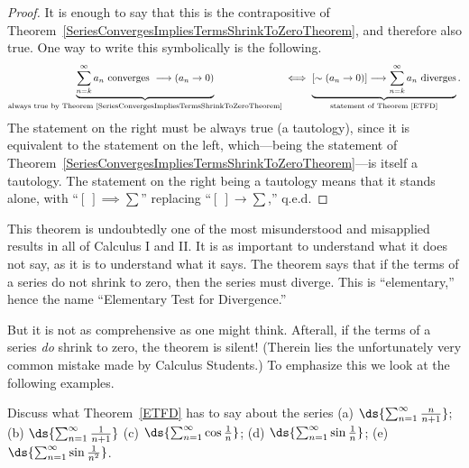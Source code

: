\begin{proof} It is enough to say that this is the contrapositive of 
Theorem~\ref{SeriesConvergesImpliesTermsShrinkToZeroTheorem},
and therefore also true.
One way to write this symbolically is the following.
$$\underbrace{\sum_{n=k}^\infty a_n\text{ converges }
\longrightarrow \left(a_n\to 0\right)}_{\text{always true by
Theorem~\ref{SeriesConvergesImpliesTermsShrinkToZeroTheorem}}}
\iff
\underbrace{
\left[\sim\left(a_n\to 0\right)\right]
\longrightarrow
\sum_{n=k}^\infty a_n\text{ diverges}}_{\text{statement of
Theorem~\ref{ETFD}}}.$$
The statement on the right must be always true (a tautology),
since it is equivalent to the statement on the left,
which---being the statement of  
Theorem~\ref{SeriesConvergesImpliesTermsShrinkToZeroTheorem}---is
itself a tautology.  The statement on the right being a 
tautology means that it stands alone, with ``$[\ ]\implies\sum$''
replacing ``$[\ ]\longrightarrow\sum$,'' q.e.d.
\end{proof}
This theorem is undoubtedly one of 
the most misunderstood and misapplied results
in all of Calculus I and II.  It is as important to understand
what it does not say, as it is to understand what it says.
The theorem says that if the terms of a series do not 
shrink to zero, then the series must diverge.  This is 
``elementary,'' hence the name ``Elementary Test for Divergence.\footnotemark''

But it is not as comprehensive as one might think.  Afterall,
if the terms of a series {\it do} shrink to zero, the 
theorem is silent!  (Therein lies the unfortunately
very common mistake made by Calculus Students.)
To emphasize this we look at the following examples.

\bex Discuss what Theorem~\ref{ETFD} has to say about
the series \newline
(a) $\ds{\sum_{n=1}^\infty\frac{n}{n+1}}$;\hfill
(b) $\ds{\sum_{n=1}^\infty\frac1{n+1}}$\hfill
(c) $\ds{\sum_{n=1}^\infty\cos\frac1{n}}$;\hfill
(d) $\ds{\sum_{n=1}^\infty\sin\frac1{n}}$;\hfill
(e) $\ds{\sum_{n=1}^\infty\sin\frac1{n^2}}$.

